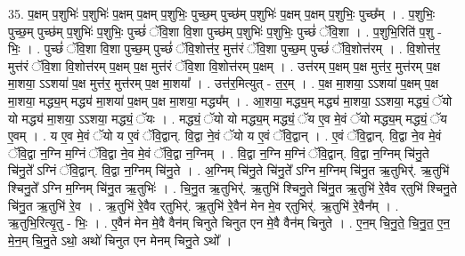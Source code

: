 \documentclass[17pt]{extarticle}
\begin{document}
35. प॒क्षम् प॒शुभिः॑ प॒शुभिः॑ प॒क्षम् प॒क्षम् प॒शुभिः॒ पुच्छ॒म् पुच्छ॑म् प॒शुभिः॑ प॒क्षम् प॒क्षम् प॒शुभिः॒ पुच्छ᳚म् । . प॒शुभिः॒ पुच्छ॒म् पुच्छ॑म् प॒शुभिः॑ प॒शुभिः॒ पुच्छं॑ ॅवि॒शा वि॒शा पुच्छ॑म् प॒शुभिः॑ प॒शुभिः॒ पुच्छं॑ ॅवि॒शा । . प॒शुभि॒रिति॑ प॒शु - भिः॒ । . पुच्छं॑ ॅवि॒शा वि॒शा पुच्छ॒म् पुच्छं॑ ॅवि॒शोत्त॑र॒ मुत्त॑रं ॅवि॒शा पुच्छ॒म् पुच्छं॑ ॅवि॒शोत्त॑रम् । . वि॒शोत्त॑र॒ मुत्त॑रं ॅवि॒शा वि॒शोत्त॑रम् प॒क्षम् प॒क्ष मुत्त॑रं ॅवि॒शा वि॒शोत्त॑रम् प॒क्षम् । . उत्त॑रम् प॒क्षम् प॒क्ष मुत्त॑र॒ मुत्त॑रम् प॒क्ष मा॒शया॒ ऽऽशया॑ प॒क्ष मुत्त॑र॒ मुत्त॑रम् प॒क्ष मा॒शया᳚ । . उत्त॑र॒मित्युत् - त॒र॒म् । . प॒क्ष मा॒शया॒ ऽऽशया॑ प॒क्षम् प॒क्ष मा॒शया॒ मद्ध्य॒म् मद्ध्य॑ मा॒शया॑ प॒क्षम् प॒क्ष मा॒शया॒ मद्ध्य᳚म् । . आ॒शया॒ मद्ध्य॒म् मद्ध्य॑ मा॒शया॒ ऽऽशया॒ मद्ध्यं॒ ॅयो यो मद्ध्य॑ मा॒शया॒ ऽऽशया॒ मद्ध्यं॒ ॅयः । . मद्ध्यं॒ ॅयो यो मद्ध्य॒म् मद्ध्यं॒ ॅय ए॒व मे॒वं ॅयो मद्ध्य॒म् मद्ध्यं॒ ॅय ए॒वम् । . य ए॒व मे॒वं ॅयो य ए॒वं ॅवि॒द्वान्. वि॒द्वा ने॒वं ॅयो य ए॒वं ॅवि॒द्वान् । . ए॒वं ॅवि॒द्वान्. वि॒द्वा ने॒व मे॒वं ॅवि॒द्वा न॒ग्नि म॒ग्निं ॅवि॒द्वा ने॒व मे॒वं ॅवि॒द्वा न॒ग्निम् । . वि॒द्वा न॒ग्नि म॒ग्निं ॅवि॒द्वान्. वि॒द्वा न॒ग्निम् चि॑नु॒ते चि॑नु॒ते᳚ ऽग्निं ॅवि॒द्वान्. वि॒द्वा न॒ग्निम् चि॑नु॒ते । . अ॒ग्निम् चि॑नु॒ते चि॑नु॒ते᳚ ऽग्नि म॒ग्निम् चि॑नु॒त ऋ॒तुभिर्॑. ऋ॒तुभि॑ श्चिनु॒ते᳚ ऽग्नि म॒ग्निम् चि॑नु॒त ऋ॒तुभिः॑ । . चि॒नु॒त ऋ॒तुभिर्॑. ऋ॒तुभि॑ श्चिनु॒ते चि॑नु॒त ऋ॒तुभि॑ रे॒वैव र्‌तुभि॑ श्चिनु॒ते चि॑नु॒त ऋ॒तुभि॑ रे॒व । . ऋ॒तुभि॑ रे॒वैव र्‌तुभिर्॑. ऋ॒तुभि॑ रे॒वैन॑ मेन मे॒व र्‌तुभिर्॑. ऋ॒तुभि॑ रे॒वैन᳚म् । . ऋ॒तुभि॒रित्यृ॒तु - भिः॒ । . ए॒वैन॑ मेन मे॒वै वैन॑म् चिनुते चिनुत एन मे॒वै वैन॑म् चिनुते । . ए॒न॒म् चि॒नु॒ते॒ चि॒नु॒त॒ ए॒न॒ मे॒न॒म् चि॒नु॒ते ऽथो॒ अथो॑ चिनुत एन मेनम् चिनु॒ते ऽथो᳚ । \newline
\end{document}
